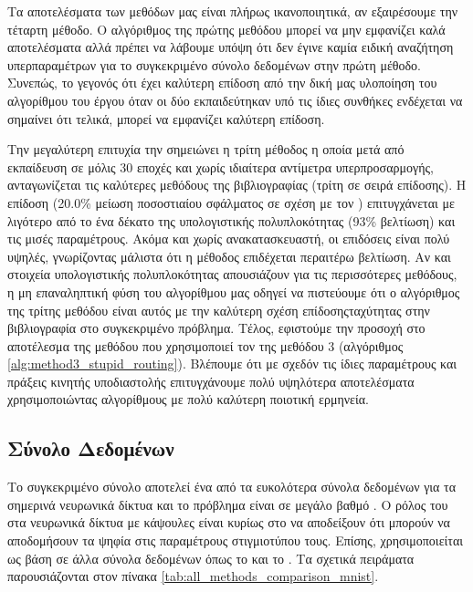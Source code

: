 Τα αποτελέσματα των μεθόδων μας είναι πλήρως ικανοποιητικά, αν εξαιρέσουμε την τέταρτη μέθοδο. Ο αλγόριθμος  της πρώτης μεθόδου μπορεί να μην εμφανίζει καλά αποτελέσματα αλλά πρέπει να λάβουμε υπόψη ότι δεν έγινε καμία ειδική αναζήτηση υπερπαραμέτρων για το συγκεκριμένο σύνολο δεδομένων στην πρώτη μέθοδο. Συνεπώς, το γεγονός ότι έχει καλύτερη επίδοση από την δική μας υλοποίηση του αλγορίθμου του έργου \cite{sabour2017dynamic} όταν οι δύο εκπαιδεύτηκαν υπό τις ίδιες συνθήκες ενδέχεται να σημαίνει ότι τελικά, μπορεί να εμφανίζει καλύτερη επίδοση.\par

Την μεγαλύτερη επιτυχία την σημειώνει η τρίτη μέθοδος η οποία μετά από εκπαίδευση σε μόλις 30 εποχές και χωρίς ιδιαίτερα αντίμετρα υπερπροσαρμογής, ανταγωνίζεται τις καλύτερες μεθόδους της βιβλιογραφίας (τρίτη σε σειρά επίδοσης). Η επίδοση  (20.0\% μείωση ποσοστιαίου σφάλματος σε σχέση με τον ) επιτυγχάνεται με λιγότερο από το ένα δέκατο της υπολογιστικής πολυπλοκότητας (93\% βελτίωση) και τις μισές παραμέτρους. Ακόμα και χωρίς ανακατασκευαστή, οι επιδόσεις είναι πολύ υψηλές, γνωρίζοντας μάλιστα ότι η μέθοδος επιδέχεται περαιτέρω βελτίωση. Αν και στοιχεία υπολογιστικής πολυπλοκότητας απουσιάζουν για τις περισσότερες μεθόδους, η μη επαναληπτική φύση του αλγορίθμου μας οδηγεί να πιστεύουμε ότι ο αλγόριθμος  της τρίτης μεθόδου είναι αυτός με την καλύτερη σχέση επίδοσης\textendash ταχύτητας στην βιβλιογραφία στο συγκεκριμένο πρόβλημα. Τέλος, εφιστούμε την προσοχή στο αποτέλεσμα της μεθόδου  \cite{mazzia2021efficient} που χρησιμοποιεί τον  της μεθόδου 3 (αλγόριθμος \ref{alg:method3_stupid_routing}). Βλέπουμε ότι με σχεδόν τις ίδιες παραμέτρους και πράξεις κινητής υποδιαστολής επιτυγχάνουμε πολύ υψηλότερα αποτελέσματα χρησιμοποιώντας αλγορίθμους με πολύ καλύτερη ποιοτική ερμηνεία.

\subsection{Σύνολο Δεδομένων }

Το συγκεκριμένο σύνολο αποτελεί ένα από τα ευκολότερα σύνολα δεδομένων για τα σημερινά νευρωνικά δίκτυα και το πρόβλημα είναι σε μεγάλο βαθμό . Ο ρόλος του στα νευρωνικά δίκτυα με κάψουλες είναι κυρίως στο να αποδείξουν ότι μπορούν να αποδομήσουν τα ψηφία στις παραμέτρους στιγμιοτύπου τους. Επίσης, χρησιμοποιείται ως βάση σε άλλα σύνολα δεδομένων όπως το  και το . Τα σχετικά πειράματα παρουσιάζονται στον πίνακα \ref{tab:all_methods_comparison_mnist}.

